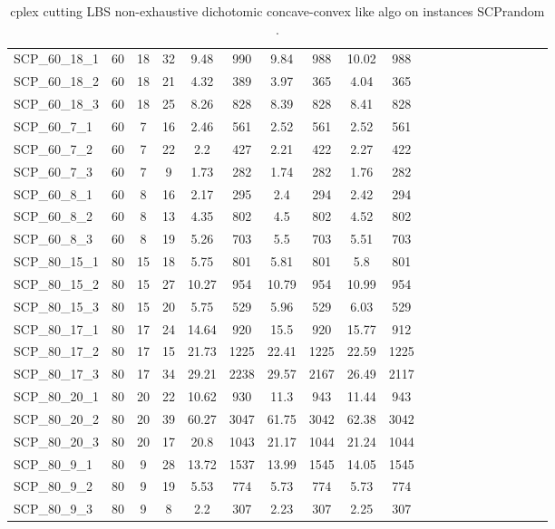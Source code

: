 \begin{sidewaystable}[!ht]
{\begin{tabular}{lccccccccccccccccccc}
SCP\_60\_18\_1 & 60 & 18 & 32 & 9.48 & 990 & 9.84 & 988 & 10.02 & 988 \\
SCP\_60\_18\_2 & 60 & 18 & 21 & 4.32 & 389 & 3.97 & 365 & 4.04 & 365 \\
SCP\_60\_18\_3 & 60 & 18 & 25 & 8.26 & 828 & 8.39 & 828 & 8.41 & 828 \\
SCP\_60\_7\_1 & 60 & 7 & 16 & 2.46 & 561 & 2.52 & 561 & 2.52 & 561 \\
SCP\_60\_7\_2 & 60 & 7 & 22 & 2.2 & 427 & 2.21 & 422 & 2.27 & 422 \\
SCP\_60\_7\_3 & 60 & 7 & 9 & 1.73 & 282 & 1.74 & 282 & 1.76 & 282 \\
SCP\_60\_8\_1 & 60 & 8 & 16 & 2.17 & 295 & 2.4 & 294 & 2.42 & 294 \\
SCP\_60\_8\_2 & 60 & 8 & 13 & 4.35 & 802 & 4.5 & 802 & 4.52 & 802 \\
SCP\_60\_8\_3 & 60 & 8 & 19 & 5.26 & 703 & 5.5 & 703 & 5.51 & 703 \\
SCP\_80\_15\_1 & 80 & 15 & 18 & 5.75 & 801 & 5.81 & 801 & 5.8 & 801 \\
SCP\_80\_15\_2 & 80 & 15 & 27 & 10.27 & 954 & 10.79 & 954 & 10.99 & 954 \\
SCP\_80\_15\_3 & 80 & 15 & 20 & 5.75 & 529 & 5.96 & 529 & 6.03 & 529 \\
SCP\_80\_17\_1 & 80 & 17 & 24 & 14.64 & 920 & 15.5 & 920 & 15.77 & 912 \\
SCP\_80\_17\_2 & 80 & 17 & 15 & 21.73 & 1225 & 22.41 & 1225 & 22.59 & 1225 \\
SCP\_80\_17\_3 & 80 & 17 & 34 & 29.21 & 2238 & 29.57 & 2167 & 26.49 & 2117 \\
SCP\_80\_20\_1 & 80 & 20 & 22 & 10.62 & 930 & 11.3 & 943 & 11.44 & 943 \\
SCP\_80\_20\_2 & 80 & 20 & 39 & 60.27 & 3047 & 61.75 & 3042 & 62.38 & 3042 \\
SCP\_80\_20\_3 & 80 & 20 & 17 & 20.8 & 1043 & 21.17 & 1044 & 21.24 & 1044 \\
SCP\_80\_9\_1 & 80 & 9 & 28 & 13.72 & 1537 & 13.99 & 1545 & 14.05 & 1545 \\
SCP\_80\_9\_2 & 80 & 9 & 19 & 5.53 & 774 & 5.73 & 774 & 5.73 & 774 \\
SCP\_80\_9\_3 & 80 & 9 & 8 & 2.2 & 307 & 2.23 & 307 & 2.25 & 307 \\
\bottomrule
\end{tabular}
}%
\caption{cplex cutting LBS non-exhaustive dichotomic concave-convex like algo on instances SCPrandom .}
\label{tab:table2_lambda_limits_SCPrandom }
\end{sidewaystable}
